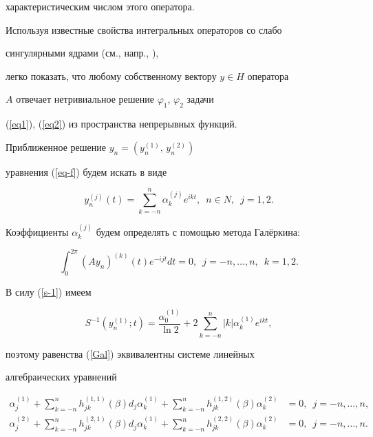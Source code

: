 характеристическим числом этого оператора.


Используя известные свойства интегральных операторов со слабо


сингулярными ядрами (см., напр., \cite{209611220016}),


легко показать, что любому собственному вектору $y \in H$ оператора


$A$ отвечает нетривиальное решение $\varphi_1$, $\varphi_2$ задачи


(\ref{eq1}), (\ref{eq2}) из пространства непрерывных функций. 





Приближенное решение $y_n=(y_n^{(1)},\, y_n^{(2)})$


уравнения (\ref{eq-f}) будем искать в виде


$$


y_n^{(j)}(t)=\sum_{k=-n}^n\alpha_k^{(j)}e^{ikt},\ \; n\in N,\ \; j=1,2.


$$


Коэффициенты $\alpha_k^{(j)}$ будем определять с помощью метода Гал\"еркина:


\begin{equation}


\label{Gal}


\int_0^{2\pi}(Ay_n)^{(k)}(t)e^{-ijt}dt = 0,\ \;j=-n,\dotsc,n,\ \;k=1,2.


\end{equation}


В силу (\ref{s-1}) имеем


$$


S^{-1}(y_n^{(1)};t)=\frac{\alpha_0^{(1)}}{\ln 2}+


2\sum_{k=-n}^{n}|k|\alpha_k^{(1)}e^{ikt},


$$


поэтому равенства (\ref{Gal}) эквивалентны системе линейных 


алгебраических уравнений


\begin{align}


\label{slae1}


\alpha_j^{(1)}+


\sum_{k=-n}^n h_{jk}^{(1,1)}(\beta)d_j \alpha_k^{(1)}+


\sum_{k=-n}^n h_{jk}^{(1,2)}(\beta) \alpha_k^{(2)}&=0,\ \; j=-n,\dotsc,n,\\


\label{slae2}


\alpha_j^{(2)}+


\sum_{k=-n}^n h_{jk}^{(2,1)}(\beta)d_j \alpha_k^{(1)}+


\sum_{k=-n}^n h_{jk}^{(2,2)}(\beta) \alpha_k^{(2)}&=0,\ \;j=-n,\dotsc,n.


\end{align}



